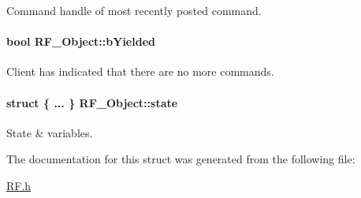 Command handle of most recently posted command. 

\paragraph[{b\+Yielded}]{\setlength{\rightskip}{0pt plus 5cm}bool R\+F\+\_\+\+Object\+::b\+Yielded}\label{struct_r_f___object_a0b8d281afbb2a67d5b238b30fa1f8849}


Client has indicated that there are no more commands. 

\paragraph[{state}]{\setlength{\rightskip}{0pt plus 5cm}struct \{ ... \}   R\+F\+\_\+\+Object\+::state}\label{struct_r_f___object_a2690b9a688416515bafa40617e266c89}


State \& variables. 



The documentation for this struct was generated from the following file\+:\begin{DoxyCompactItemize}
\item 
\hyperlink{_r_f_8h}{R\+F.\+h}\end{DoxyCompactItemize}
